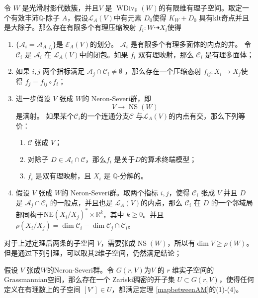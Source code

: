\begin{theorem}\label{mapbetweenAM}
  \cite[Theorem 3.3]{haconSarkisovProgram2012} 令 $W$ 是光滑射影代数簇，并且$ V $ 是 $ \operatorname{WDiv}_{\mathbb{R}}(W) $的有限维有理子空间。取定一个有效丰沛$\mathbb{Q}$-除子 $A$，假设$\mathcal{L}_{A}(V)$中有元素 $D_{0}$使得 $K_{W}+D_{0}$ 具有klt奇点并且是大除子。那么存在有限多个有理压缩映射 $ f_i:W\dashrightarrow X_i $使得 
  \begin{enumerate}
    \item $ \{\mathcal{A}_i=\mathcal{A}_{A,f_i}\} $是 $ \mathcal{E}_{A}(V) $的划分。 $ \mathcal{A}_{i} $ 是有限多个有理多面体的内点的并。 令$\mathcal{C}_{i}$ 是 $\mathcal{A}_{i}$ 在 $\mathcal{L}_{A}(V)$中的闭包。如果 $ f_i $ 双有理映射，那么 $ \mathcal{C}_i$ 是有理多面体；
    \item 如果 $ i,j $ 两个指标满足 $ \mathcal{A}_j\cap \mathcal{C}_i\neq \emptyset $ ，那么存在一个压缩态射 $ f_{ij}:X_i\to X_j $使得 $ f_j=f_{ij}\circ f_i $；
    \item 进一步假设 $ V $ 张成 $W$的 Neron-Severi群，即
          \[ V \to \operatorname{NS}(W) \]
          是满射。 如果某个$ \mathcal{C}_i $的一个连通分支$ \mathcal{C} $ 与$ \mathcal{L}_A(V) $的内点有交，那么下列等价：
          \begin{enumerate}
            \item $ \mathcal{C} $ 张成 $ V $；
            \item 对除子 $ D\in \mathcal{A}_i\cap \mathcal{C} $，那么$ f_i $ 是关于$ D $的算术终端模型；
            \item $ f_i $ 是双有理映射，且 $ X_i $ 是 $ \mathbb{Q} $-分解的。
          \end{enumerate}
    \item 假设 $ V $ 张成 $W$的 Neron-Severi群。取两个指标 $ i,j $，使得 $ \mathcal{C}_i $ 张成 $ V $ 并且 $ D $ 是 $ \mathcal{A}_j\cap \mathcal{C}_i $ 的一般点，并且也是 $ \mathcal{L}_A(V) $的内点，那么 $ \mathcal{C}_i $ 在 $D$ 的一个邻域局部同构于$ \overline{\mathrm{NE}}(X_i/X_j)^*\times \mathbb{R}^k $，其中 $ k\geqslant 0 $。并且 $ \rho(X_i/X_j)=\dim  \mathcal{C}_i-\dim \mathcal{C}_j\cap \mathcal{C}_i   $。
  \end{enumerate}
\end{theorem}
对于上述定理后两条的子空间 $V$，需要张成$\operatorname{NS}(W)$，所以有$\dim V \geqslant \rho(W)$。但是通过下列引理，可以取其2维子空间，仍然满足结论；
\begin{lemma}\label{subspace}
  \cite[Corollary 3.4]{haconSarkisovProgram2012} 假设 $V$ 张成$W$的Neron-Severi群。令 $G(r, V)$为$V$ 的 $r$ 维实子空间的 Grassmannian空间，那么存在一个  Zariski稠密的开子集  $U \subset G(r, V)$，使得任何定义在有理数上的子空间  $[V']\in U$，都满足定理 \ref{mapbetweenAM}的(1)-(4)。
\end{lemma}

